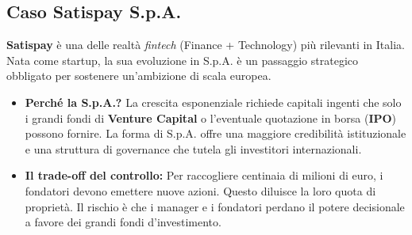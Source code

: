 \documentclass[a4paper,12pt]{article}
\begin{document}

	
	\subsection{Caso Satispay S.p.A.}
	\textbf{Satispay} è una delle realtà \textit{fintech} (Finance + Technology) più rilevanti in Italia. Nata come startup, la sua evoluzione in S.p.A. è un passaggio strategico obbligato per sostenere un'ambizione di scala europea.
	
	\begin{itemize}
		\item \textbf{Perché la S.p.A.?} La crescita esponenziale richiede capitali ingenti che solo i grandi fondi di \textbf{Venture Capital} o l'eventuale quotazione in borsa (\textbf{IPO}) possono fornire. La forma di S.p.A. offre una maggiore credibilità istituzionale e una struttura di governance che tutela gli investitori internazionali.
		\item \textbf{Il trade-off del controllo:} Per raccogliere centinaia di milioni di euro, i fondatori devono emettere nuove azioni. Questo diluisce la loro quota di proprietà. Il rischio è che i manager e i fondatori perdano il potere decisionale a favore dei grandi fondi d'investimento.
	\end{itemize}
	
\end{document}
